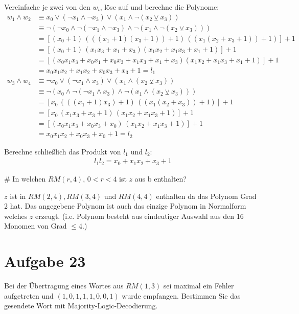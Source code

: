\begin{myList}
Vereinfache je zwei von den $w_i$, löse auf und berechne die Polynome:
\begin{align*}
	w_1 \wedge w_2 &\equiv  x_0 \vee (\neg x_1 \wedge \neg x_3) \vee ( x_1 \wedge \neg(x_2 \veebar x_3)) \\
	&\equiv \neg(\neg x_0 \wedge \neg(\neg x_1 \wedge \neg x_3) \wedge \neg(x_1 \wedge \neg (x_2 \veebar x_3)))\\
	&= [(x_0+1)\, (((x_1+1)(x_3+1))+1)\, ((x_1(x_2+x_3+1))+1 )] +1 \\
	&= [(x_0+1)\, (x_1x_3 + x_1 + x_3)(x_1x_2+x_1x_3+x_1+1)]+1 \\
	&= [(x_0x_1x_3 + x_0x_1 + x_0x_3 + x_1x_3 + x_1 + x_3)(x_1x_2+x_1x_3+x_1+1)]+1 \\
	&= x_0x_1x_2 + x_1x_2 + x_0x_3 +x_3 +1 = l_1 \\
	w_3 \wedge w_4 &\equiv \neg x_0 \vee (\neg x_1 \wedge x_3) \vee (x_1 \wedge (x_2 \veebar x_3)) \\
	&\equiv \neg(x_0 \wedge \neg(\neg x_1 \wedge x_3) \wedge \neg(x_1 \wedge (x_2 \veebar x_3))) \\
	&= [x_0\, (((x_1+1)x_3)+1) \, ((x_1(x_2 +x_3))+1)] +1\\
	&= [x_0\, (x_1x_3 +x_3 + 1) \, (x_1x_2 + x_1x_3 + 1) ] +1 \\
	&= [(x_0x_1x_3 + x_0x_3 + x_0)\, (x_1x_2 + x_1x_3 + 1) ] +1 \\
	&= x_0x_1x_2 + x_0x_3 + x_0 + 1 = l_2
\end{align*}

Berechne schließlich das Produkt von $l_1$ und $l_2$:
\begin{align*}
	l_1l_2 = x_0 + x_1x_2 + x_3 + 1
\end{align*}

#
In welchen $RM(r,4)$, $0 < r < 4$ ist $z$ aus b enthalten?\medskip

$z$ ist in $RM(2,4),RM(3,4)$ und $RM(4,4)$ enthalten da das Polynom Grad 2 hat.
Das angegebene Polynom ist auch das einzige Polynom in Normalform welches $z$ erzeugt.
(i.e. Polynom besteht aus eindeutiger Auswahl aus den 16 Monomen von Grad $\leq 4$.)
\end{myList}

\section*{Aufgabe 23}
Bei der Übertragung eines Wortes aus $RM(1,3)$ sei maximal ein Fehler aufgetreten und $(1,0,1,1,1,0,0,1)$ wurde empfangen. Bestimmen Sie das gesendete Wort mit Majority-Logic-Decodierung.\medskip

